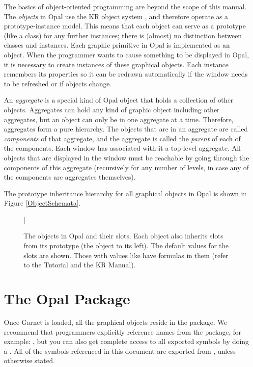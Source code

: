 The basics of object-oriented programming are beyond the scope of this
manual.  The {\it objects} in Opal use the KR object system \cite{KRTR2}, and
therefore operate as a prototype-instance model.  This means that each
object can serve as a prototype (like a class) for any further instances;
there is (almost) no distinction between classes and instances.  Each
graphic primitive in Opal is implemented as an object.  When the programmer
wants to cause something to be displayed in Opal, it is necessary to create
instances of these graphical objects.  Each instance remembers its
properties so it can be redrawn automatically if the window needs to
be refreshed or if objects change.

An {\it aggregate} is a special kind of Opal object that holds a collection
of other objects.  Aggregates can hold any kind
of graphic object including other aggregates, but an object can only be in
one aggregate at a time.  Therefore, aggregates form a pure hierarchy.
The objects that are in an aggregate are called {\it components} of that
aggregate, and the aggregate is called the {\it parent} of each of the components.
Each window has associated with it a top-level aggregate.  All objects that
are displayed in the window must be reachable by going through the
components of this aggregate (recursively for any number of levels, in case
any of the components are aggregates themselves).

The prototype inheritance hierarchy for all graphical objects in Opal is
shown in Figure \ref{ObjectSchemata}.

\begin{figure}
\begin{center}
\end{center}
\bar{}
\caption{The objects in Opal and their slots.  Each object also inherits slots
from its prototype (the object to its left).  The default
values for the slots are shown.  Those with values like  have
formulas in them (refer to the Tutorial and the KR Manual).}
\end{figure}


\section{The Opal Package}
Once Garnet is loaded, all the graphical objects reside in the 
package.  We recommend that programmers explicitly reference names
from the  package, for example: , but you
can also get complete access to all exported symbols by doing a
{\obeyspaces {}}.  All of the symbols referenced in this
document are exported from , unless otherwise stated.



